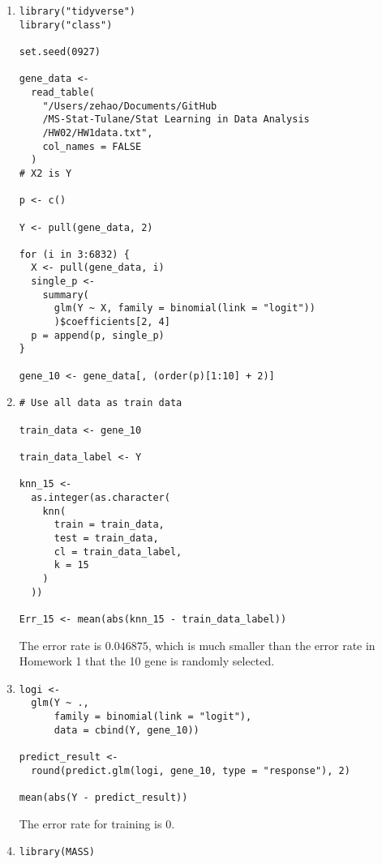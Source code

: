 \documentclass[14pt]{elegantbook}
\begin{document}
\begin{solution}
  \begin{enumerate}
    \item \begin{verbatim}
library("tidyverse")
library("class")

set.seed(0927)

gene_data <-
  read_table(
    "/Users/zehao/Documents/GitHub
    /MS-Stat-Tulane/Stat Learning in Data Analysis
    /HW02/HW1data.txt",
    col_names = FALSE
  )
# X2 is Y

p <- c()

Y <- pull(gene_data, 2)

for (i in 3:6832) {
  X <- pull(gene_data, i)
  single_p <-
    summary(
      glm(Y ~ X, family = binomial(link = "logit"))
      )$coefficients[2, 4]
  p = append(p, single_p)
}

gene_10 <- gene_data[, (order(p)[1:10] + 2)]
    \end{verbatim}
    \item \begin{verbatim}
# Use all data as train data

train_data <- gene_10

train_data_label <- Y

knn_15 <-
  as.integer(as.character(
    knn(
      train = train_data,
      test = train_data,
      cl = train_data_label,
      k = 15
    )
  ))

Err_15 <- mean(abs(knn_15 - train_data_label))
    \end{verbatim}
    The error rate is $0.046875$, which is much smaller than the error rate in Homework 1 that the 10 gene is randomly selected. 
    \item \begin{verbatim}
logi <-
  glm(Y ~ .,
      family = binomial(link = "logit"),
      data = cbind(Y, gene_10))

predict_result <-
  round(predict.glm(logi, gene_10, type = "response"), 2)

mean(abs(Y - predict_result))
    \end{verbatim}
    The error rate for training is $0$. 
    \item \begin{verbatim}
library(MASS)


\end{verbatim}
\end{enumerate}
\end{solution}
\end{document}
